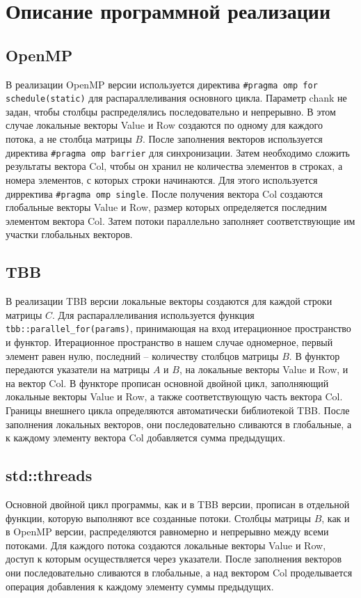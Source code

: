 \documentclass{report}
\begin{document}
\section*{Описание программной реализации}

\subsection*{OpenMP}
В реализации OpenMP версии используется директива \verb|#pragma omp for schedule(static)| для распараллеливания основного цикла. Параметр chank не задан, чтобы столбцы распределялись последовательно и непрерывно. В этом случае локальные векторы Value и Row создаются по одному для каждого потока, а не столбца матрицы $B$. После заполнения векторов используется директива \verb|#pragma omp barrier| для синхронизации. Затем необходимо сложить результаты вектора Col, чтобы он хранил не количества элементов в строках, а номера элементов, с которых строки начинаются. Для этого используется дирректива \verb|#pragma omp single|. После получения вектора Col создаются глобальные векторы Value и Row, размер которых определяется последним элементом вектора Col. Затем потоки параллельно заполняет соответствующие им участки глобальных векторов.

\subsection*{TBB}
В реализации TBB версии локальные векторы создаются для каждой строки матрицы $C$. Для распараллеливания используется функция \verb|tbb::parallel_for(params)|, принимающая на вход итерационное пространство и функтор. Итерационное пространство в нашем случае одномерное, первый элемент равен нулю, последний -- количеству столбцов матрицы $B$. В функтор передаются указатели на матрицы $A$ и $B$, на локальные векторы Value и Row, и на вектор Col. В функторе прописан основной двойной цикл, заполняющий локальные векторы Value и Row, а также соответствующую часть вектора Col. Границы внешнего цикла определяются автоматически библиотекой TBB. После заполнения локальных векторов, они последовательно сливаются в глобальные, а к каждому элементу вектора Col добавляется сумма предыдущих.

\subsection*{std::threads}
Основной двойной цикл программы, как и в TBB версии, прописан в отдельной функции, которую выполняют все созданные потоки. Столбцы матрицы $B$, как и в OpenMP версии, распределяются равномерно и непрерывно между всеми потоками. Для каждого потока создаются локальные векторы Value и Row, доступ к которым осуществляется через указатели. После заполнения векторов они последовательно сливаются в глобальные, а над вектором Col проделывается операция добавления к каждому элементу суммы предыдущих.
\newpage
\end{document}
